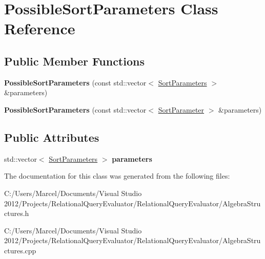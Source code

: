 \hypertarget{class_possible_sort_parameters}{\section{Possible\+Sort\+Parameters Class Reference}
\label{class_possible_sort_parameters}
}
\subsection*{Public Member Functions}
\begin{DoxyCompactItemize}
\item 
\hypertarget{class_possible_sort_parameters_a08aad6763c347ad2a4dc2f20183efc24}{{\bfseries Possible\+Sort\+Parameters} (const std\+::vector$<$ \hyperlink{class_sort_parameters}{Sort\+Parameters} $>$ \&parameters)}\label{class_possible_sort_parameters_a08aad6763c347ad2a4dc2f20183efc24}

\item 
\hypertarget{class_possible_sort_parameters_abf5abacee677c21a76de099cac60aa1a}{{\bfseries Possible\+Sort\+Parameters} (const std\+::vector$<$ \hyperlink{class_sort_parameter}{Sort\+Parameter} $>$ \&parameters)}\label{class_possible_sort_parameters_abf5abacee677c21a76de099cac60aa1a}

\end{DoxyCompactItemize}
\subsection*{Public Attributes}
\begin{DoxyCompactItemize}
\item 
\hypertarget{class_possible_sort_parameters_ac7cd94ff83acacceb9adee62c4228e7f}{std\+::vector$<$ \hyperlink{class_sort_parameters}{Sort\+Parameters} $>$ {\bfseries parameters}}\label{class_possible_sort_parameters_ac7cd94ff83acacceb9adee62c4228e7f}

\end{DoxyCompactItemize}


The documentation for this class was generated from the following files\+:\begin{DoxyCompactItemize}
\item 
C\+:/\+Users/\+Marcel/\+Documents/\+Visual Studio 2012/\+Projects/\+Relational\+Query\+Evaluator/\+Relational\+Query\+Evaluator/Algebra\+Structures.\+h\item 
C\+:/\+Users/\+Marcel/\+Documents/\+Visual Studio 2012/\+Projects/\+Relational\+Query\+Evaluator/\+Relational\+Query\+Evaluator/Algebra\+Structures.\+cpp\end{DoxyCompactItemize}

